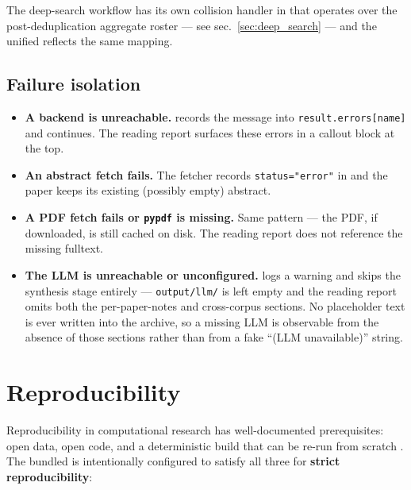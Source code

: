 \documentclass[
]{article}
\providecommand{\tightlist}{%
  \setlength{\itemsep}{0pt}\setlength{\parskip}{0pt}}
\begin{document}
The deep-search workflow has its own collision handler in
 that operates over the
post-deduplication aggregate roster --- see sec.~\ref{sec:deep_search}
--- and the unified  reflects the same
mapping.

\subsection{Failure isolation}\label{failure-isolation}

\begin{itemize}
\tightlist
\item
  \textbf{A backend is unreachable.}  records
  the message into \texttt{result.errors{[}name{]}} and continues. The
  reading report surfaces these errors in a callout block at the top.
\item
  \textbf{An abstract fetch fails.} The fetcher records
  \texttt{status="error"} in  and the paper
  keeps its existing (possibly empty) abstract.
\item
  \textbf{A PDF fetch fails or \texttt{pypdf} is missing.} Same pattern
  --- the PDF, if downloaded, is still cached on disk. The reading
  report does not reference the missing fulltext.
\item
  \textbf{The LLM is unreachable or unconfigured.}
   logs a warning and skips the
  synthesis stage entirely --- \texttt{output/llm/} is left empty and
  the reading report omits both the per-paper-notes and cross-corpus
  sections. No placeholder text is ever written into the archive, so a
  missing LLM is observable from the absence of those sections rather
  than from a fake ``(LLM unavailable)'' string.
\end{itemize}

\newpage

\section{Reproducibility}\label{sec:reproducibility}

Reproducibility in computational research has well-documented
prerequisites: open data, open code, and a deterministic build that can
be re-run from scratch \citep{peng2011reproducible}. The bundled
 is intentionally configured to satisfy
all three for \textbf{strict reproducibility}:
\end{document}
